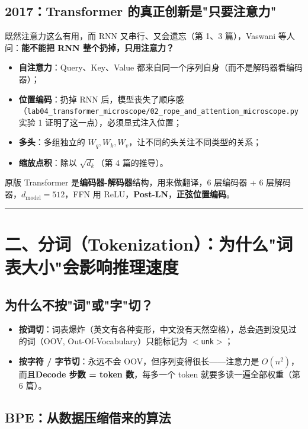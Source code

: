 \subsection{2017：Transformer 的真正创新是"只要注意力"}

既然注意力这么有用，而 RNN 又串行、又会遗忘（第 1、3 篇），Vaswani 等人问：\textbf{能不能把 RNN 整个扔掉，只用注意力？}
\begin{itemize}
  \item \textbf{自注意力}：Query、Key、Value 都来自同一个序列自身（而不是解码器看编码器）；
  \item \textbf{位置编码}：扔掉 RNN 后，模型丧失了顺序感（\texttt{lab04\_transformer\_microscope/02\_rope\_and\_attention\_microscope.py} 实验 1 证明了这一点），必须显式注入位置；
  \item \textbf{多头}：多组独立的 $W_q, W_k, W_v$，让不同的头关注不同类型的关系；
  \item \textbf{缩放点积}：除以 $\sqrt{d_k}$（第 4 篇的推导）。
\end{itemize}

原版 Transformer 是\textbf{编码器-解码器}结构，用来做翻译，6 层编码器 + 6 层解码器，$d_{\text{model}} = 512$，FFN 用 ReLU，\textbf{Post-LN}，\textbf{正弦位置编码}。

\vspace{0.8em}\hrule\vspace{0.8em}

\section{二、分词（Tokenization）：为什么"词表大小"会影响推理速度}

\subsection{为什么不按"词"或"字"切？}

\begin{itemize}
  \item \textbf{按词切}：词表爆炸（英文有各种变形，中文没有天然空格），总会遇到没见过的词（OOV, Out-Of-Vocabulary）只能标记为 \texttt{$<$unk$>$}；
  \item \textbf{按字符 / 字节切}：永远不会 OOV，但序列变得很长——注意力是 $O(n^2)$，而且\textbf{Decode 步数 = token 数}，每多一个 token 就要多读一遍全部权重（第 6 篇）。
\end{itemize}

\subsection{BPE：从数据压缩借来的算法}

